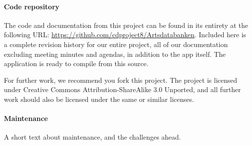 \paragraph{Code repository}\hspace{1mm}\newline

The code and documentation from this project can be found in its entirety at
the following URL: \url{https://github.com/cdproject8/Artsdatabanken}. Included
here is a complete revision history for our entire project, all of our
documentation excluding meeting minutes and agendas, in addition to the app
itself. The application is ready to compile from this source.

For further work, we recommend you fork this project. The project is licensed
under Creative Commons Attribution-ShareAlike 3.0 Unported, and all further
work should also be licensed under the same or similar licenses.

\paragraph{Maintenance}\hspace{1mm}\newline

A short text about maintenance, and the challenges ahead.
